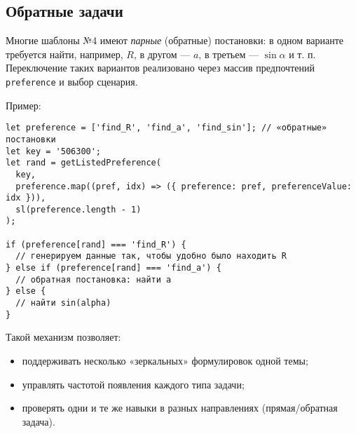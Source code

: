 
\subsection{Обратные задачи}
Многие шаблоны №4 имеют \emph{парные} (обратные) постановки: в одном варианте требуется найти, например, \(R\), в другом — \(a\), в третьем — \(\sin\alpha\) и т. п. 
Переключение таких вариантов реализовано через массив предпочтений \verb|preference| и выбор сценария. 

Пример: 
\begin{lstlisting}
let preference = ['find_R', 'find_a', 'find_sin']; // «обратные» постановки
let key = '506300';
let rand = getListedPreference(
  key,
  preference.map((pref, idx) => ({ preference: pref, preferenceValue: idx })),
  sl(preference.length - 1)
);

if (preference[rand] === 'find_R') {
  // генерируем данные так, чтобы удобно было находить R
} else if (preference[rand] === 'find_a') {
  // обратная постановка: найти a
} else {
  // найти sin(alpha)
}
\end{lstlisting}

\noindent Такой механизм позволяет:
\begin{itemize}
  \item поддерживать несколько «зеркальных» формулировок одной темы;
  \item управлять частотой появления каждого типа задачи;
  \item проверять одни и те же навыки в разных направлениях (прямая/обратная задача).
\end{itemize}

 
